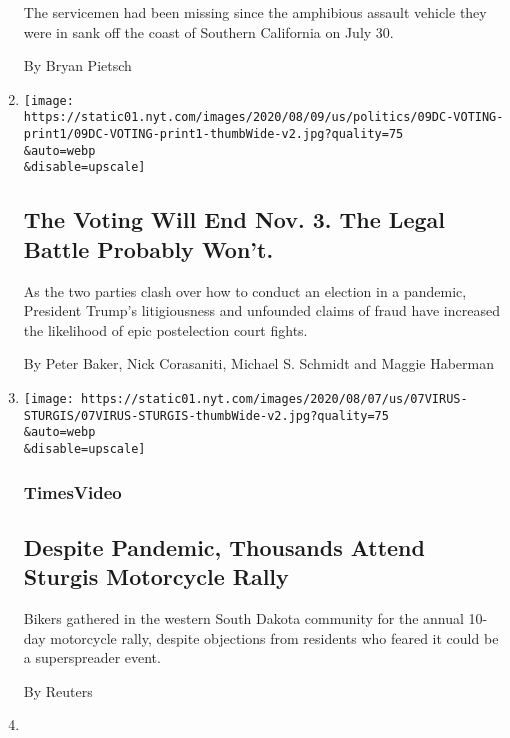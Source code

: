 \begin{enumerate}
  The servicemen had been missing since the amphibious assault vehicle
  they were in sank off the coast of Southern California on July 30.

  By Bryan Pietsch
\item
  \href{/2020/08/08/us/politics/voting-nov-3-election.html}{}

  \texttt{[image: https://static01.nyt.com/images/2020/08/09/us/politics/09DC-VOTING-print1/09DC-VOTING-print1-thumbWide-v2.jpg?quality=75\\\&auto=webp\\\&disable=upscale]}

  \hypertarget{the-voting-will-end-nov-3-the-legal-battle-probably-wont}{%
  \subsection{The Voting Will End Nov. 3. The Legal Battle Probably
  Won't.}\label{the-voting-will-end-nov-3-the-legal-battle-probably-wont}}

  As the two parties clash over how to conduct an election in a
  pandemic, President Trump's litigiousness and unfounded claims of
  fraud have increased the likelihood of epic postelection court fights.

  By Peter Baker, Nick Corasaniti, Michael S. Schmidt and Maggie
  Haberman
\item
  \href{/video/us/100000007279713/sturgis-motorcycle-rally-coronavirus.html}{}

  \texttt{[image: https://static01.nyt.com/images/2020/08/07/us/07VIRUS-STURGIS/07VIRUS-STURGIS-thumbWide-v2.jpg?quality=75\\\&auto=webp\\\&disable=upscale]}

  \hypertarget{timesvideo}{%
  \subsubsection{TimesVideo}\label{timesvideo}}

  \hypertarget{despite-pandemic-thousands-attend-sturgis-motorcycle-rally}{%
  \subsection{Despite Pandemic, Thousands Attend Sturgis Motorcycle
  Rally}\label{despite-pandemic-thousands-attend-sturgis-motorcycle-rally}}

  Bikers gathered in the western South Dakota community for the annual
  10-day motorcycle rally, despite objections from residents who feared
  it could be a superspreader event.

  By Reuters
\item
  \href{/2020/08/08/us/politics/kristi-noem-pence-trump.html}{}


\end{enumerate}
